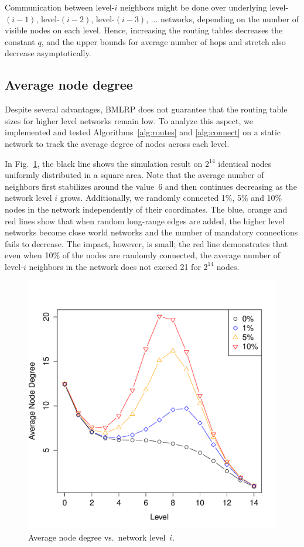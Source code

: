 \documentclass[conference]{IEEEtran}
\theoremstyle{definition}
\begin{document}
Communication between level-$i$ neighbors might be done over underlying level-$(i-1)$, level-$(i-2)$, level-$(i-3)$, ... networks, depending on the number of visible nodes on each level. Hence, increasing the routing tables decreases the constant $q$, and the upper bounds for average number of hops and stretch also decrease asymptotically.


\subsection{Average node degree}
\label{sec:analysis:nodedegree}

Despite several advantages, BMLRP does not guarantee that the routing table sizes for higher level networks remain low. To analyze this aspect, we implemented and tested Algorithms~\ref{alg:routes} and \ref{alg:connect} on a static network to track the average degree of nodes across each level.

In Fig.~\ref{fig:degrees}, the black line shows the simulation result on $2^{14}$ identical nodes uniformly distributed in a square area. Note that the average number of neighbors first stabilizes around the value~6 and then continues decreasing as the network level $i$ grows. Additionally, we randomly connected 1\%, 5\% and 10\% nodes in the network independently of their coordinates. The blue, orange and red lines show that when random long-range edges are added, the higher level networks become close world networks and the number of mandatory connections fails to decrease. The impact, however, is small; the red line demonstrates that even when 10\% of the nodes are randomly connected, the average number of level-$i$ neighbors in the network does not exceed 21 for $2^{14}$ nodes.

\begin{figure}[H]
   \includegraphics[width=0.95\linewidth]{degrees}

   \caption{Average node degree vs.\ network level~$i$.}
    \label{fig:degrees}
\end{figure}
\end{document}
